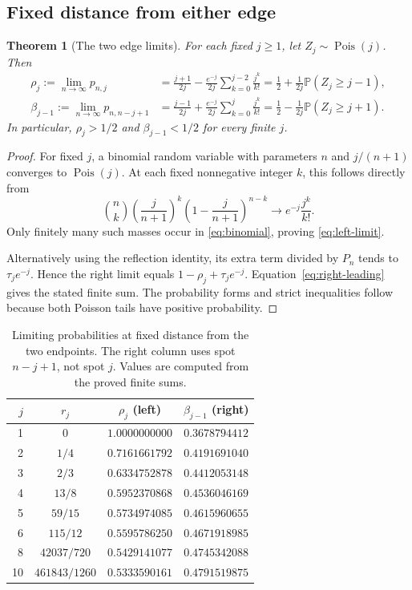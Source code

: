 \documentclass[11pt,letterpaper]{article}
\numberwithin{equation}{section}
\newtheorem{theorem}{Theorem}[section]
\theoremstyle{definition}
\newcommand{\PP}{\mathbb P}
\DeclareMathOperator{\Pois}{Pois}
\begin{document}
\subsection{Fixed distance from either edge}
\begin{theorem}[The two edge limits]\label{thm:limits}
For each fixed $j\ge1$, let $Z_j\sim\Pois(j)$. Then
\begin{align}
 \rho_j:=\lim_{n\to\infty}p_{n,j}
 &=\frac{j+1}{2j}-\frac{e^{-j}}{2j}
                      \sum_{k=0}^{j-2}\frac{j^k}{k!}
  =\frac12+\frac1{2j}\PP(Z_j\ge j-1),
 \label{eq:left-limit}\\
 \beta_{j-1}:=\lim_{n\to\infty}p_{n,n-j+1}
 &=\frac{j-1}{2j}+\frac{e^{-j}}{2j}
                      \sum_{k=0}^{j}\frac{j^k}{k!}
  =\frac12-\frac1{2j}\PP(Z_j\ge j+1).
 \label{eq:right-limit}
\end{align}
In particular, $\rho_j>1/2$ and $\beta_{j-1}<1/2$ for every finite $j$.
\end{theorem}
\begin{proof}
For fixed $j$, a binomial random variable with parameters
$n$ and $j/(n+1)$ converges to $\Pois(j)$. At each fixed nonnegative integer
$k$, this follows directly from
\[
 \binom nk\left(\frac{j}{n+1}\right)^k
 \left(1-\frac{j}{n+1}\right)^{n-k}
       \longrightarrow e^{-j}\frac{j^k}{k!}.
\]
Only finitely many such masses occur in \eqref{eq:binomial}, proving
\eqref{eq:left-limit}.

Alternatively using the reflection identity, its extra term divided by
$P_n$ tends to $\tau_j e^{-j}$. Hence the right limit equals
$1-\rho_j+\tau_j e^{-j}$. Equation~\eqref{eq:right-leading} gives the
stated finite sum. The probability forms and strict inequalities follow
because both Poisson tails have positive probability.
\end{proof}

\begin{table}[htbp]
\centering
\caption{Limiting probabilities at fixed distance from the two endpoints.
The right column uses spot $n-j+1$, not spot $j$. Values are computed from
the proved finite sums.}
\label{tab:limits}
\begin{tabular}{rccc}
\toprule
$j$ & $r_j$ & $\rho_j$ (left) & $\beta_{j-1}$ (right)\\
\midrule
1 & $0$ & $1.0000000000$ & $0.3678794412$\\
2 & $1/4$ & $0.7161661792$ & $0.4191691040$\\
3 & $2/3$ & $0.6334752878$ & $0.4412053148$\\
4 & $13/8$ & $0.5952370868$ & $0.4536046169$\\
5 & $59/15$ & $0.5734974085$ & $0.4615960655$\\
6 & $115/12$ & $0.5595786250$ & $0.4671918985$\\
8 & $42037/720$ & $0.5429141077$ & $0.4745342088$\\
10 & $461843/1260$ & $0.5333590161$ & $0.4791519875$\\
\bottomrule
\end{tabular}
\end{table}
\end{document}
